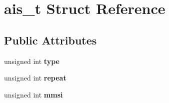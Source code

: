 \hypertarget{structais__t}{\section{ais\-\_\-t \-Struct \-Reference}
\label{structais__t}
}
\subsection*{\-Public \-Attributes}
\begin{DoxyCompactItemize}
\item 
\hypertarget{structais__t_ac7bbde4320573902e3f499c28134e6b4}{unsigned int {\bfseries type}}\label{structais__t_ac7bbde4320573902e3f499c28134e6b4}

\item 
\hypertarget{structais__t_af8f1bc36a5362101810783e1de0ef994}{unsigned int {\bfseries repeat}}\label{structais__t_af8f1bc36a5362101810783e1de0ef994}

\item 
\hypertarget{structais__t_a1adf1d694a1c5fa3c6b086768a30452a}{unsigned int {\bfseries mmsi}}\label{structais__t_a1adf1d694a1c5fa3c6b086768a30452a}


\end{DoxyCompactItemize}
